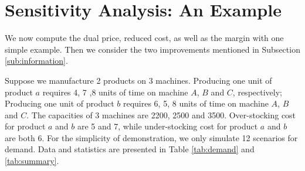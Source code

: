 \documentclass[a4paper,11pt]{article}
\begin{document}
\section{Sensitivity Analysis: An Example}
\label{se:sensitivity}

We now compute the dual price, reduced cost, as well as the margin with one simple example. Then we consider the two improvements mentioned in Subsection \ref{sub:information}.

\begin{table}[ht]
\caption{Demand Realisations: Example}
\label{tab:demand}
\centering
{}
\end{table}

\begin{table}[ht]
\caption{Demand Realisations: Statistical Summary}
\label{tab:summary}
\centering
{}
\end{table}

Suppose we manufacture 2 products on 3 machines. Producing one unit of product $a$ requires 4, 7 ,8 units of time on machine $A$, $B$ and $C$, respectively; Producing one unit of product $b$ requires 6, 5, 8 units of time on machine $A$, $B$ and $C$. The capacities of 3 machines are 2200, 2500 and 3500. Over-stocking cost for product $a$ and $b$ are 5 and 7, while under-stocking cost for product $a$ and $b$ are both 6. For the simplicity of demonstration, we only simulate 12 scenarios for demand. Data and statistics are presented in Table \ref{tab:demand} and \ref{tab:summary}.
\end{document}
